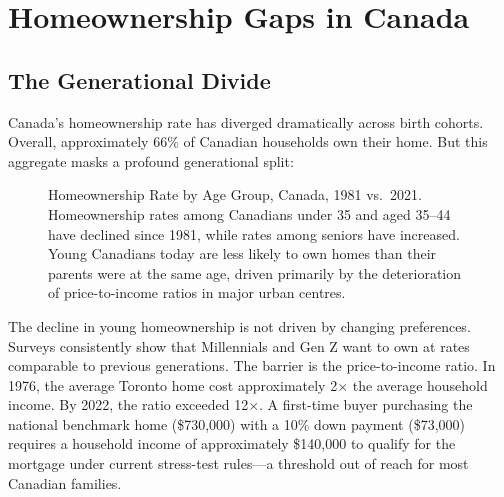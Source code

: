 \section{Homeownership Gaps in Canada}

\subsection{The Generational Divide}

Canada's homeownership rate has diverged dramatically across birth cohorts. Overall, approximately 66\% of Canadian households own their home. But this aggregate masks a profound generational split:

\begin{figure}[H]
\centering
{}
\caption{Homeownership Rate by Age Group, Canada, 1981 vs.\ 2021. Homeownership rates
  among Canadians under 35 and aged 35--44 have declined since 1981, while rates among
  seniors have increased. Young Canadians today are less likely to own homes than their
  parents were at the same age, driven primarily by the deterioration of price-to-income
  ratios in major urban centres.}
\label{fig:homeownership_age}
\end{figure}

The decline in young homeownership is not driven by changing preferences. Surveys consistently show that Millennials and Gen Z want to own at rates comparable to previous generations. The barrier is the price-to-income ratio. In 1976, the average Toronto home cost approximately 2$\times$ the average household income. By 2022, the ratio exceeded 12$\times$. A first-time buyer purchasing the national benchmark home (\$730,000) with a 10\% down payment (\$73,000) requires a household income of approximately \$140,000 to qualify for the mortgage under current stress-test rules---a threshold out of reach for most Canadian families.

